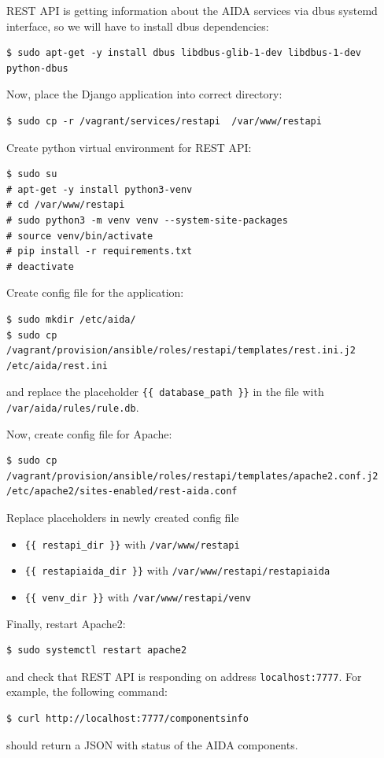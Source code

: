 \documentclass[a4paper]{article} %
\begin{document}
REST API is getting information about the AIDA services via dbus systemd interface, so we will have to install dbus dependencies:
\begin{lstlisting}
$ sudo apt-get -y install dbus libdbus-glib-1-dev libdbus-1-dev python-dbus
\end{lstlisting}

Now, place the Django application into correct directory:
\begin{lstlisting}
$ sudo cp -r /vagrant/services/restapi  /var/www/restapi
\end{lstlisting}

Create python virtual environment for REST API:
\begin{lstlisting}
$ sudo su
# apt-get -y install python3-venv
# cd /var/www/restapi
# sudo python3 -m venv venv --system-site-packages
# source venv/bin/activate
# pip install -r requirements.txt
# deactivate
\end{lstlisting}

Create config file for the application:
\begin{lstlisting}
$ sudo mkdir /etc/aida/
$ sudo cp /vagrant/provision/ansible/roles/restapi/templates/rest.ini.j2 /etc/aida/rest.ini
\end{lstlisting}
and replace the placeholder \texttt{\{\{ database\_path \}\}} in the file with \texttt{/var/aida/rules/rule.db}.

Now, create config file for Apache:
\begin{lstlisting}
$ sudo cp /vagrant/provision/ansible/roles/restapi/templates/apache2.conf.j2 /etc/apache2/sites-enabled/rest-aida.conf
\end{lstlisting}
Replace placeholders in newly created config file
\begin{itemize}[noitemsep,nolistsep]
\item \texttt{\{\{ restapi\_dir \}\}} with \texttt{/var/www/restapi}
\item \texttt{\{\{ restapiaida\_dir \}\}} with \texttt{/var/www/restapi/restapiaida}
\item \texttt{\{\{ venv\_dir \}\}} with \texttt{/var/www/restapi/venv}
\end{itemize}

Finally, restart Apache2:
\begin{lstlisting}
$ sudo systemctl restart apache2
\end{lstlisting}
and check that REST API is responding on address \texttt{localhost:7777}. For example, the following command:
\begin{lstlisting}
$ curl http://localhost:7777/componentsinfo
\end{lstlisting}
should return a JSON with status of the AIDA components.
\end{document}
